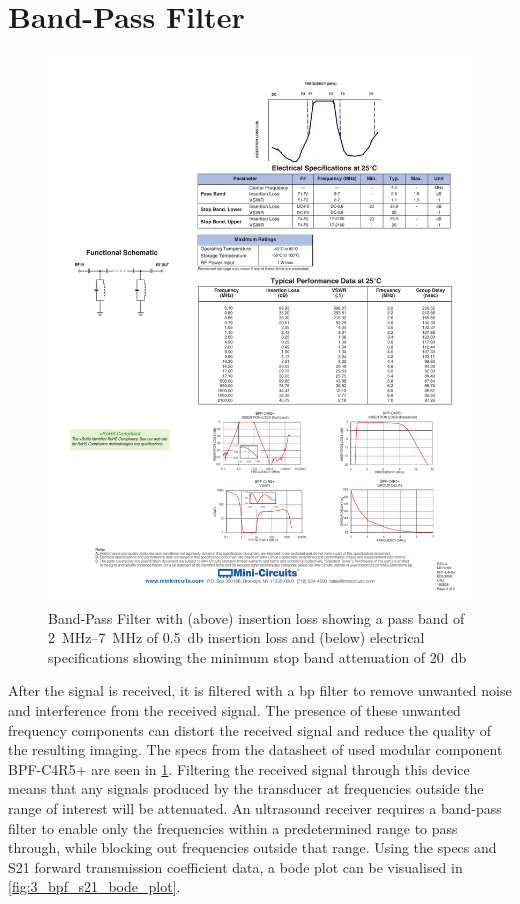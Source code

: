 \section{Band-Pass Filter}
\begin{figure}[htbp]
	\centering
	\includegraphics[width=\textwidth]{Figures/3_bpf_specs.pdf}
	\caption[Band-Pass Filter insertion loss and specifications]{Band-Pass Filter with (above) insertion loss showing a pass band of \qtyrange{2}{7}{\mega\hertz} of \qty{0.5}{\decibel} insertion loss and (below) electrical specifications showing the minimum stop band attenuation of \qty{20}{\decibel} \cite{BPF}}
	\label{fig:3_bpf_specs}
\end{figure}
After the signal is received, it is filtered with a \gls{bp} filter to remove unwanted noise and interference from the received signal. The presence of these unwanted frequency components can distort the received signal and reduce the quality of the resulting imaging. The specs from the datasheet of used modular component BPF-C4R5+ \cite{BPF} are seen in \cref{fig:3_bpf_specs}. Filtering the received signal through this device means that any signals produced by the transducer at frequencies outside the range of interest will be attenuated. An ultrasound receiver requires a band-pass filter to enable only the frequencies within a predetermined range to pass through, while blocking out frequencies outside that range. Using the specs and S21 forward transmission coefficient data, a bode plot can be visualised in \cref{fig:3_bpf_s21_bode_plot}.

